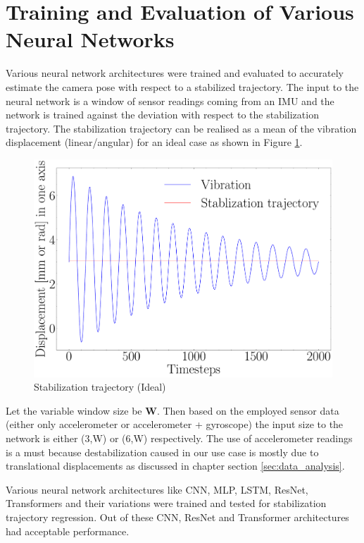 \section{Training and Evaluation of Various Neural Networks}
\label{sec:train_evaluate}
Various neural network architectures were trained and evaluated to accurately estimate the camera pose with respect to a stabilized trajectory. The input to the neural network is a window of sensor readings coming from an IMU and the network is trained against the deviation with respect to the stabilization trajectory. The stabilization trajectory can be realised as a mean of the vibration displacement (linear/angular) for an ideal case as shown in Figure \ref{fig:stab_traj_ideal}. 

\begin{figure}
    \centering
    \includegraphics[scale=0.25]{images/fig_chapter2/stab_traj_ideal.pdf}
    \caption{Stabilization trajectory (Ideal)}
    \label{fig:stab_traj_ideal}
\end{figure}

Let the variable window size be \textbf{W}. Then based on the employed sensor data (either only accelerometer or accelerometer + gyroscope) the input size to the network is either (3,W) or (6,W) respectively. The use of accelerometer readings is a must because destabilization caused in our use case is mostly due to translational displacements as discussed in chapter section \ref{sec:data_analysis}. 

Various neural network architectures like CNN, MLP, LSTM, ResNet, Transformers and their variations were trained and tested for stabilization trajectory regression. Out of these CNN, ResNet and Transformer architectures had acceptable performance. 

